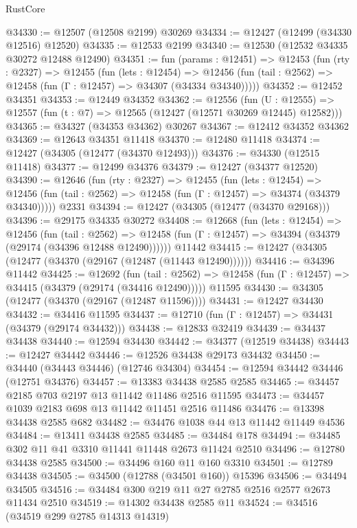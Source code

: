 \begin{lexlean}{RustCore}
\begin{coremodule}
@34330 := @12507 (@12508 @2199) @30269
@34334 := @12427 (@12499 (@34330 @12516) @12520)
@34335 := @12533 @2199
@34340 := @12530 (@12532 @34335 @30272 @12488 @12490)
@34351 := fun (params : @12451) =>
  @12453
    (fun (rty : @2327) =>
    @12455
      (fun (lets : @12454) =>
      @12456 (fun (tail : @2562) => @12458 (fun (Γ : @12457) => @34307 (@34334 @34340)))))
@34352 := @12452 @34351
@34353 := @12449 @34352
@34362 := @12556
    (fun (U : @12555) => @12557 (fun (t : @7) => @12565 (@12427 (@12571 @30269 @12445) @12582)))
@34365 := @34327 (@34353 @34362) @30267
@34367 := @12412 @34352 @34362
@34369 := @12643 @34351 @11418
@34370 := @12480 @11418
@34374 := @12427 (@34305 (@12477 (@34370 @12493)))
@34376 := @34330 (@12515 @11418)
@34377 := @12499 @34376
@34379 := @12427 (@34377 @12520)
@34390 := @12646
    (fun (rty : @2327) =>
    @12455
      (fun (lets : @12454) =>
      @12456 (fun (tail : @2562) => @12458 (fun (Γ : @12457) => @34374 (@34379 @34340)))))
    @2331
@34394 := @12427 (@34305 (@12477 (@34370 @29168)))
@34396 := @29175 @34335 @30272
@34408 := @12668
    (fun (lets : @12454) =>
    @12456
      (fun (tail : @2562) =>
      @12458 (fun (Γ : @12457) => @34394 (@34379 (@29174 (@34396 @12488 @12490))))))
    @11442
@34415 := @12427 (@34305 (@12477 (@34370 (@29167 (@12487 (@11443 @12490))))))
@34416 := @34396 @11442
@34425 := @12692
    (fun (tail : @2562) => @12458 (fun (Γ : @12457) => @34415 (@34379 (@29174 (@34416 @12490)))))
    @11595
@34430 := @34305 (@12477 (@34370 (@29167 (@12487 @11596))))
@34431 := @12427 @34430
@34432 := @34416 @11595
@34437 := @12710 (fun (Γ : @12457) => @34431 (@34379 (@29174 @34432)))
@34438 := @12833 @32419
@34439 := @34437 @34438
@34440 := @12594 @34430
@34442 := @34377 (@12519 @34438)
@34443 := @12427 @34442
@34446 := @12526 @34438 @29173 @34432
@34450 := @34440 (@34443 @34446) (@12746 @34304)
@34454 := @12594 @34442 @34446 (@12751 @34376)
@34457 := @13383 @34438 @2585 @2585
@34465 := @34457 @2185 @703 @2197 @13 @11442 @11486 @2516 @11595
@34473 := @34457 @1039 @2183 @698 @13 @11442 @11451 @2516 @11486
@34476 := @13398 @34438 @2585 @682
@34482 := @34476 @1038 @44 @13 @11442 @11449 @4536
@34484 := @13411 @34438 @2585
@34485 := @34484 @178
@34494 := @34485 @302 @11 @41 @3310 @11441 @11448 @2673 @11424 @2510
@34496 := @12780 @34438 @2585
@34500 := @34496 @160 @11 @160 @3310
@34501 := @12789 @34438
@34505 := @34500 (@12788 (@34501 @160)) @15396
@34506 := @34494 @34505
@34516 := @34484 @300 @219 @11 @27 @2785 @2516 @2577 @2673 @11434 @2510
@34519 := @14302 @34438 @2585 @11
@34524 := @34516 (@34519 @299 @2785 @14313 @14319)

\end{coremodule}
\end{lexlean}
